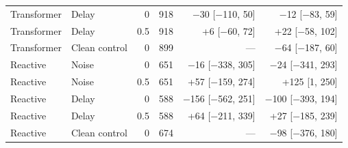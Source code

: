 \begin{table}[t]
\begin{tabular*}{\textwidth}{@{\extracolsep{\fill}}llrrrr@{}}
Transformer & Delay & 0 & 918 & \ensuremath{-}30 [\ensuremath{-}110, 50] & \ensuremath{-}12 [\ensuremath{-}83, 59] \\
Transformer & Delay & 0.5 & 918 & +6 [\ensuremath{-}60, 72] & +22 [\ensuremath{-}58, 102] \\
Transformer & Clean control & 0 & 899 & --- & \ensuremath{-}64 [\ensuremath{-}187, 60] \\
Reactive & Noise & 0 & 651 & \ensuremath{-}16 [\ensuremath{-}338, 305] & \ensuremath{-}24 [\ensuremath{-}341, 293] \\
Reactive & Noise & 0.5 & 651 & +57 [\ensuremath{-}159, 274] & +125 [1, 250] \\
Reactive & Delay & 0 & 588 & \ensuremath{-}156 [\ensuremath{-}562, 251] & \ensuremath{-}100 [\ensuremath{-}393, 194] \\
Reactive & Delay & 0.5 & 588 & +64 [\ensuremath{-}211, 339] & +27 [\ensuremath{-}185, 239] \\
Reactive & Clean control & 0 & 674 & --- & \ensuremath{-}98 [\ensuremath{-}376, 180] \\
\bottomrule
\end{tabular*}
\end{table}
